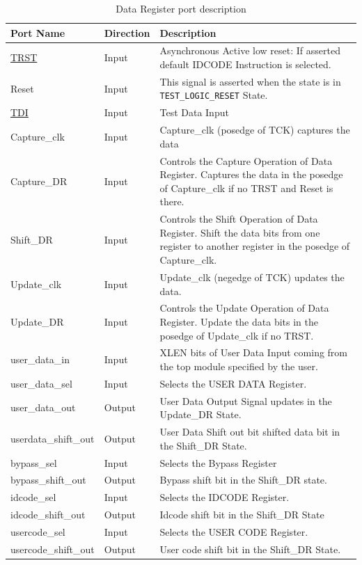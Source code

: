 \begin{longtable}{l l p{9.5cm}}
    \caption{Data Register port description}
    \label{tab:data-reg-ports}\\
    \hline
         \textbf{Port Name} & \textbf{Direction} & \textbf{Description}\\ \hline \hline
        \hyperref[subsec:trst]{TRST} & Input & Asynchronous Active low reset: If asserted default IDCODE Instruction is selected. \\ \hline
        Reset & Input & This signal is asserted when the state is in \texttt{TEST\_LOGIC\_RESET} State. \\ \hline
        \hyperref[subsec:tdi]{TDI} & Input & Test Data Input \\ \hline 
        Capture\_clk & Input & Capture\_clk (posedge of TCK) captures the data \\ \hline
        Capture\_DR & Input & Controls the Capture Operation of Data Register. Captures the data in the posedge of Capture\_clk if no TRST and Reset is there. \\ \hline
        Shift\_DR & Input & Controls the Shift Operation of Data Register. Shift the data bits from one register to another register in the posedge of Capture\_clk. \\ \hline
        Update\_clk & Input & Update\_clk (negedge of TCK) updates the data.\\ \hline
        Update\_DR & Input & Controls the Update Operation of Data Register. Update the data bits in the posedge of Update\_clk if no TRST. \\ \hline
        user\_data\_in & Input & XLEN bits of User Data Input coming from the top module specified by the user. \\ \hline
        user\_data\_sel & Input & Selects the USER DATA Register. \\ \hline
        user\_data\_out & Output & User Data Output Signal updates in the Update\_DR State. \\ \hline
        userdata\_shift\_out & Output & User Data Shift out bit shifted data bit in the Shift\_DR State.  \\ \hline
        bypass\_sel & Input & Selects the Bypass Register  \\ \hline
        bypass\_shift\_out & Output & Bypass shift bit in the Shift\_DR state.  \\ \hline
        idcode\_sel & Input & Selects the IDCODE Register. \\ \hline
        idcode\_shift\_out & Output & Idcode shift bit in the Shift\_DR State  \\ \hline
        usercode\_sel & Input & Selects the USER CODE Register.  \\ \hline
        usercode\_shift\_out & Output & User code shift bit in the Shift\_DR State.  \\ \hline
\end{longtable}

